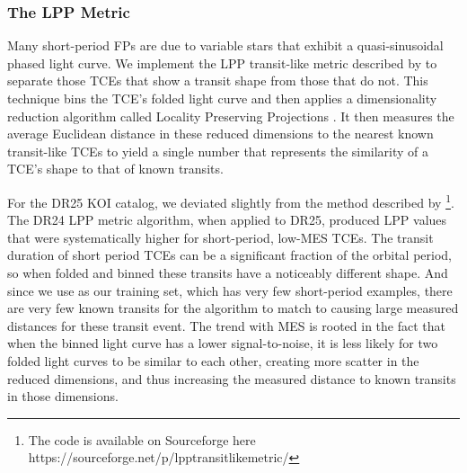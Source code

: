 

\subsubsection{The LPP Metric}
\label{s:lpp}

Many short-period FPs are due to variable stars that exhibit a quasi-sinusoidal phased light curve. We implement the LPP transit-like metric described by \citet{Thompson2015b} to separate those TCEs that show a transit shape from those that do not. This technique bins the TCE's folded light curve and then applies a dimensionality reduction algorithm called Locality Preserving Projections \citep[LPP, ][]{He2004}.  It then measures the average Euclidean distance in these reduced dimensions to the nearest known transit-like TCEs to yield a single number that represents the similarity of a TCE's shape to that of known transits. 

For the DR25 KOI catalog, we deviated slightly from the method described by \citet{Thompson2015b}\footnote{The code is available on Sourceforge here https://sourceforge.net/p/lpptransitlikemetric/}.  The DR24 LPP metric algorithm, when applied to DR25, produced LPP values that were systematically higher for short-period, low-MES TCEs. The transit duration of short period TCEs can be a significant fraction of the orbital period, so when folded and binned these transits have a noticeably different shape. And since we use  as our training set, which has very few short-period examples, there are very few known transits for the algorithm to match to causing large measured distances for these transit event. The trend with MES is rooted in the fact that when the binned light curve has a lower signal-to-noise, it is less likely for two folded light curves to be similar to each other, creating more scatter in the reduced dimensions, and thus increasing the measured distance to known transits in those dimensions.  

